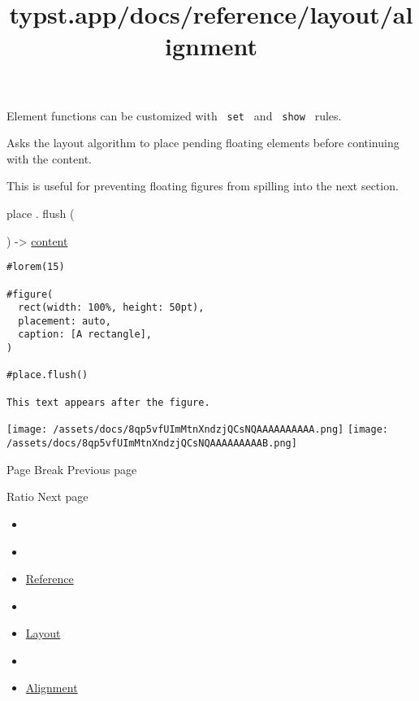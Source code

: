\label{definitions-flush-element-tooltip}
Element functions can be customized with \texttt{\ set\ } and
\texttt{\ show\ } rules.

Asks the layout algorithm to place pending floating elements before
continuing with the content.

This is useful for preventing floating figures from spilling into the
next section.

place { . } { flush } (

) -\textgreater{} \href{/docs/reference/foundations/content/}{content}

\begin{verbatim}
#lorem(15)

#figure(
  rect(width: 100%, height: 50pt),
  placement: auto,
  caption: [A rectangle],
)

#place.flush()

This text appears after the figure.
\end{verbatim}

\texttt{[image: /assets/docs/8qp5vfUImMtnXndzjQCsNQAAAAAAAAAA.png]}
\texttt{[image: /assets/docs/8qp5vfUImMtnXndzjQCsNQAAAAAAAAAB.png]}

\href{/docs/reference/layout/pagebreak/}{\pandocbounded{}}

{ Page Break } { Previous page }

\href{/docs/reference/layout/ratio/}{\pandocbounded{}}

{ Ratio } { Next page }


\title{typst.app/docs/reference/layout/alignment}

\begin{itemize}
\tightlist
\item
  \href{/docs}{}
\item
  
\item
  \href{/docs/reference/}{Reference}
\item
  
\item
  \href{/docs/reference/layout/}{Layout}
\item
  
\item
  \href{/docs/reference/layout/alignment/}{Alignment}
\end{itemize}

